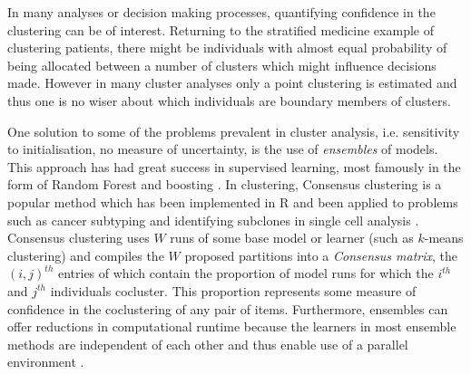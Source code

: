 \documentclass{bioinfo}
\begin{document}
In many analyses or decision making processes, quantifying confidence in the clustering can be of interest. Returning to the stratified medicine example of clustering patients, there might be individuals with almost equal probability of being allocated between a number of clusters which might influence decisions made.
However in many cluster analyses only a point clustering is estimated and thus one is no wiser about which individuals are boundary members of clusters. 

One solution to some of the problems prevalent in cluster analysis, i.e. sensitivity to initialisation, no measure of uncertainty, is the use of \emph{ensembles} of models. This approach has had great success in supervised learning, most famously in the form of Random Forest \citep{breiman2001random} and boosting \citep{friedman2002stochastic}. In clustering, Consensus clustering \citep{monti2003consensus} is a popular method which has been implemented in R \citep{wilkerson2010consensusclusterplus} and been applied to problems such as cancer subtyping \citep{lehmann2011identification, verhaak2010integrated} and identifying subclones in single cell analysis \citep{kiselev2017sc3}. Consensus clustering uses $W$ runs of some base model or learner (such as $k$-means clustering) and compiles the $W$ proposed partitions into a \emph{Consensus matrix}, the $(i, j)^{th}$ entries of which contain the proportion of model runs for which the $i^{th}$ and $j^{th}$ individuals cocluster. This proportion represents some measure of confidence in the coclustering of any pair of items. Furthermore, ensembles can offer reductions in computational runtime because the learners in most ensemble methods are independent of each other and thus enable use of a parallel environment  \citep{ghaemi2009survey}. 
\end{document}
